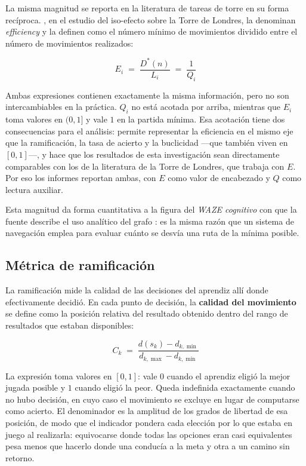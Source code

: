 \documentclass{book}
\begin{document}
La misma magnitud se reporta en la literatura de tareas de torre en
su forma recíproca. \citet{HinzFaber2009}, en el estudio del
iso-efecto sobre la Torre de Londres, la denominan
\textit{efficiency} y la definen como el número mínimo de
movimientos dividido entre el número de movimientos realizados:

\begin{equation}
    E_i \;=\; \frac{D^{*}(n)}{L_i} \;=\; \frac{1}{Q_i}
    \label{eq:eficiencia}
\end{equation}

Ambas expresiones contienen exactamente la misma información, pero
no son intercambiables en la práctica. $Q_i$ no está acotada por
arriba, mientras que $E_i$ toma valores en $(0,1]$ y vale $1$ en la
partida mínima. Esa acotación tiene dos consecuencias para el
análisis: permite representar la eficiencia en el mismo eje que la
ramificación, la tasa de acierto y la buclicidad —que también viven
en $[0,1]$—, y hace que los resultados de esta investigación sean
directamente comparables con los de la literatura de la Torre de
Londres, que trabaja con $E$. Por eso los informes reportan ambas,
con $E$ como valor de encabezado y $Q$ como lectura auxiliar.

Esta magnitud da forma cuantitativa a la figura del
\textit{WAZE cognitivo} con que la fuente describe el uso analítico
del grafo \cite{LievanoMolina2022}: es la misma razón que un sistema
de navegación emplea para evaluar cuánto se desvía una ruta de la
mínima posible.

\subsection*{Métrica de ramificación}

La ramificación mide la calidad de las decisiones del aprendiz allí
donde efectivamente decidió. En cada punto de decisión, la
\textbf{calidad del movimiento} se define como la posición relativa
del resultado obtenido dentro del rango de resultados que estaban
disponibles:

\begin{equation}
    C_k \;=\; \frac{d(s_k) - d_{k,\min}}{d_{k,\max} - d_{k,\min}}
    \label{eq:calidad_movimiento}
\end{equation}

La expresión toma valores en $[0,1]$: vale $0$ cuando el aprendiz
eligió la mejor jugada posible y $1$ cuando eligió la peor. Queda
indefinida exactamente cuando no hubo decisión, en cuyo caso el
movimiento se excluye en lugar de computarse como acierto. El
denominador es la amplitud de los grados de libertad de esa
posición, de modo que el indicador pondera cada elección por lo que
estaba en juego al realizarla: equivocarse donde todas las opciones
eran casi equivalentes pesa menos que hacerlo donde una conducía a
la meta y otra a un camino sin retorno.
\end{document}

